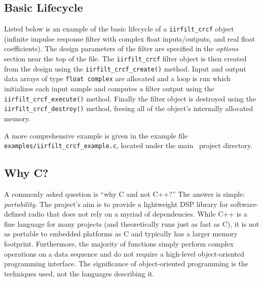 \subsection{Basic Lifecycle}
\label{section:data_structures:lifecycle}

Listed below is an example of the basic lifecycle of a
{\tt iirfilt\_crcf} object (infinite impulse response filter with
complex float inputs/outputs, and real float coefficients).
The design parameters of the filter are specified in the {\em options}
section near the top of the file.
The {\tt iirfilt\_crcf} filter object is then created from the design
using the {\tt iirfilt\_crcf\_create()} method.
Input and output data arrays of type {\tt float complex} are allocated
and a loop is run which initializes each input sample and computes a
filter output using the {\tt iirfilt\_crcf\_execute()} method.
Finally the filter object is destroyed using the
{\tt iirfilt\_crcf\_destroy()} method,
freeing all of the object's internally allocated memory.
%

%
A more comprehensive example is given in the example file
{\tt examples/iirfilt\_crcf\_example.c},
located under the main \liquid\ project directory.

\subsection{Why C?}
\label{section:data_structures:why_C}
A commonly asked question is ``why C and not C++?''
The answer is simple: {\em portability}.
The project's aim is to provide a lightweight DSP library for
software-defined radio that does not rely on a myriad of dependencies.
While C++ is a fine language for many projects
(and theoretically runs just as fast as C),
it is not as portable to embedded platforms as C and typically has a
larger memory footprint.
Furthermore, the majority of functions simply perform complex operations on a
data sequence and do not require a high-level object-oriented programming
interface.
The significance of object-oriented programming is the techniques used,
not the languages describing it.

